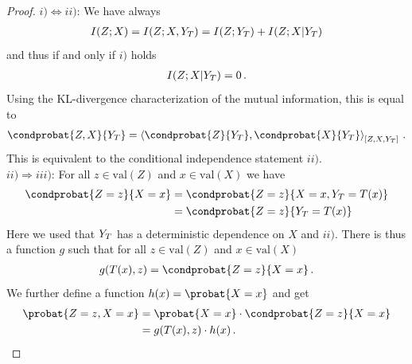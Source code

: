 \documentclass[aps,onecolumn,nofootinbib,pra]{article}
\begin{document}
    \begin{proof}
        $i) \Leftrightarrow ii)$:
        We have always
        \begin{align*}
            I(Z;X) = I(Z;X,Y_{T}) = I(Z;Y_{T}) + I(Z;X|Y_{T})
        \end{align*}
        and thus if and only if $i)$ holds
        \begin{align*}
            I(Z;X|Y_{T}) = 0 \, .
        \end{align*}
        Using the KL-divergence characterization of the mutual information, this is equal to
        \begin{align*}
            \condprobat{Z,X}{\headvariableof{T}} = \contractionof{\condprobat{Z}{\headvariableof{T}},\condprobat{X}{\headvariableof{T}} }{Z,X,\headvariableof{T}} \, .
        \end{align*}
        This is equivalent to the conditional independence statement $ii)$. \\

        $ii) \Rightarrow iii)$:
        For all $z\in\mathrm{val}(Z)$ and $x\in\mathrm{val}(X)$ we have
        \begin{align*}
            \condprobat{Z=z}{X=x}
            &= \condprobat{Z=z}{X=x,\headvariableof{T}=T(x)} \\
            &= \condprobat{Z=z}{\headvariableof{T}=T(x)}
        \end{align*}
        Here we used that $Y_{T}$ has a deterministic dependence on $X$ and $ii)$.
        There is thus a function $g$ such that for all $z\in\mathrm{val}(Z)$ and $x\in\mathrm{val}(X)$
        \begin{align*}
            g(T(x),z) = \condprobat{Z=z}{X=x} \, .
        \end{align*}
        We further define a function $h(x)=\probat{X=x}$ and get
        \begin{align*}
            \probat{Z=z,X=x}
            &= \probat{X=x} \cdot \condprobat{Z=z}{X=x} \\
            &= g(T(x),z) \cdot h(x) \, .
        \end{align*}


\end{proof}
\end{document}
